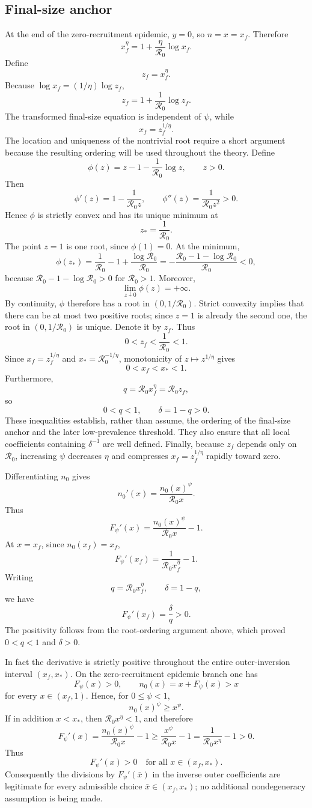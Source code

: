 \documentclass[11pt]{article}
\newcommand{\Rzero}{\mathcal R_0}
\newcommand{\Fpsi}{F_\psi}
\newcommand{\xf}{x_f}
\newcommand{\xs}{x_*}
\begin{document}
\subsection{Final-size anchor}
At the end of the zero-recruitment epidemic, $y=0$, so $n=x=\xf$. Therefore
\[
\xf^\eta
=1+\frac\eta{\Rzero}\log\xf.
\]
Define
\[
z_f=\xf^\eta.
\]
Because $\log\xf=(1/\eta)\log z_f$,
\[
\boxed{
z_f=1+\frac1{\Rzero}\log z_f.}
\]
The transformed final-size equation is independent of $\psi$, while
\[
\boxed{\xf=z_f^{1/\eta}.}
\]
The location and uniqueness of the nontrivial root require a short argument because the resulting ordering will be used throughout the theory. Define
\[
\phi(z)=z-1-\frac1{\Rzero}\log z,
\qquad z>0.
\]
Then
\[
\phi'(z)=1-\frac1{\Rzero z},
\qquad
\phi''(z)=\frac1{\Rzero z^2}>0.
\]
Hence $\phi$ is strictly convex and has its unique minimum at
\[
z_*=\frac1{\Rzero}.
\]
The point $z=1$ is one root, since $\phi(1)=0$. At the minimum,
\[
\phi(z_*)
=\frac1{\Rzero}-1+\frac{\log\Rzero}{\Rzero}
=-\frac{\Rzero-1-\log\Rzero}{\Rzero}<0,
\]
because $\Rzero-1-\log\Rzero>0$ for $\Rzero>1$. Moreover,
\[
\lim_{z\downarrow0}\phi(z)=+\infty.
\]
By continuity, $\phi$ therefore has a root in $(0,1/\Rzero)$. Strict convexity implies that there can be at most two positive roots; since $z=1$ is already the second one, the root in $(0,1/\Rzero)$ is unique. Denote it by $z_f$. Thus
\[
\boxed{
0<z_f<\frac1{\Rzero}<1.
}
\]
Since $\xf=z_f^{1/\eta}$ and $\xs=\Rzero^{-1/\eta}$, monotonicity of $z\mapsto z^{1/\eta}$ gives
\[
\boxed{
0<\xf<\xs<1.
}
\]
Furthermore,
\[
q=\Rzero\xf^\eta=\Rzero z_f,
\]
so
\[
\boxed{0<q<1,\qquad \delta=1-q>0.}
\]
These inequalities establish, rather than assume, the ordering of the final-size anchor and the later low-prevalence threshold. They also ensure that all local coefficients containing $\delta^{-1}$ are well defined. Finally, because $z_f$ depends only on $\Rzero$, increasing $\psi$ decreases $\eta$ and compresses $\xf=z_f^{1/\eta}$ rapidly toward zero.

Differentiating $n_0$ gives
\[
\boxed{
n_0'(x)=\frac{n_0(x)^\psi}{\Rzero x}.}
\]
Thus
\[
\Fpsi'(x)=\frac{n_0(x)^\psi}{\Rzero x}-1.
\]
At $x=\xf$, since $n_0(\xf)=\xf$,
\[
\Fpsi'(\xf)=\frac1{\Rzero\xf^\eta}-1.
\]
Writing
\[
q=\Rzero\xf^\eta,
\qquad
\delta=1-q,
\]
we have
\[
\boxed{\Fpsi'(\xf)=\frac\delta q>0.}
\]
The positivity follows from the root-ordering argument above, which proved $0<q<1$ and $\delta>0$.

In fact the derivative is strictly positive throughout the entire outer-inversion interval $(\xf,\xs)$. On the zero-recruitment epidemic branch one has
\[
\Fpsi(x)>0,
\qquad
n_0(x)=x+\Fpsi(x)>x
\]
for every $x\in(\xf,1)$. Hence, for $0\leq\psi<1$,
\[
n_0(x)^\psi\geq x^\psi.
\]
If in addition $x<\xs$, then $\Rzero x^\eta<1$, and therefore
\[
\Fpsi'(x)
=\frac{n_0(x)^\psi}{\Rzero x}-1
\geq
\frac{x^\psi}{\Rzero x}-1
=\frac1{\Rzero x^\eta}-1
>0.
\]
Thus
\[
\boxed{\Fpsi'(x)>0\quad\text{for all }x\in(\xf,\xs).}
\]
Consequently the divisions by $\Fpsi'(\bar x)$ in the inverse outer coefficients are legitimate for every admissible choice $\bar x\in(\xf,\xs)$; no additional nondegeneracy assumption is being made.
\end{document}
